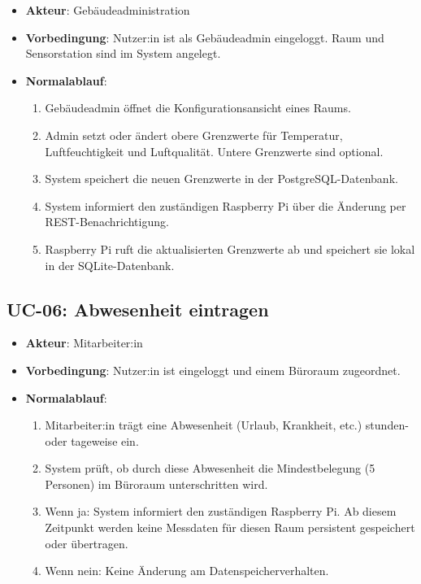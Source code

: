 \documentclass[12pt,a4paper]{article}
\begin{document}
\begin{itemize}
  \item \textbf{Akteur}: Gebäudeadministration
  \item \textbf{Vorbedingung}: Nutzer:in ist als Gebäudeadmin eingeloggt. Raum und Sensorstation sind im System angelegt.
  \item \textbf{Normalablauf}:
    \begin{enumerate}
      \item Gebäudeadmin öffnet die Konfigurationsansicht eines Raums.
      \item Admin setzt oder ändert obere Grenzwerte für Temperatur, Luftfeuchtigkeit und Luftqualität. Untere Grenzwerte sind optional.
      \item System speichert die neuen Grenzwerte in der PostgreSQL-Datenbank.
      \item System informiert den zuständigen Raspberry Pi über die Änderung per REST-Benachrichtigung.
      \item Raspberry Pi ruft die aktualisierten Grenzwerte ab und speichert sie lokal in der SQLite-Datenbank.
    \end{enumerate}
\end{itemize}

\subsection{UC-06: Abwesenheit eintragen}

\begin{itemize}
  \item \textbf{Akteur}: Mitarbeiter:in
  \item \textbf{Vorbedingung}: Nutzer:in ist eingeloggt und einem Büroraum zugeordnet.
  \item \textbf{Normalablauf}:
    \begin{enumerate}
      \item Mitarbeiter:in trägt eine Abwesenheit (Urlaub, Krankheit, etc.) stunden- oder tageweise ein.
      \item System prüft, ob durch diese Abwesenheit die Mindestbelegung (5 Personen) im Büroraum unterschritten wird.
      \item Wenn ja: System informiert den zuständigen Raspberry Pi. Ab diesem Zeitpunkt werden keine Messdaten für diesen Raum persistent gespeichert oder übertragen.
      \item Wenn nein: Keine Änderung am Datenspeicherverhalten.
    \end{enumerate}
\end{itemize}
\end{document}
